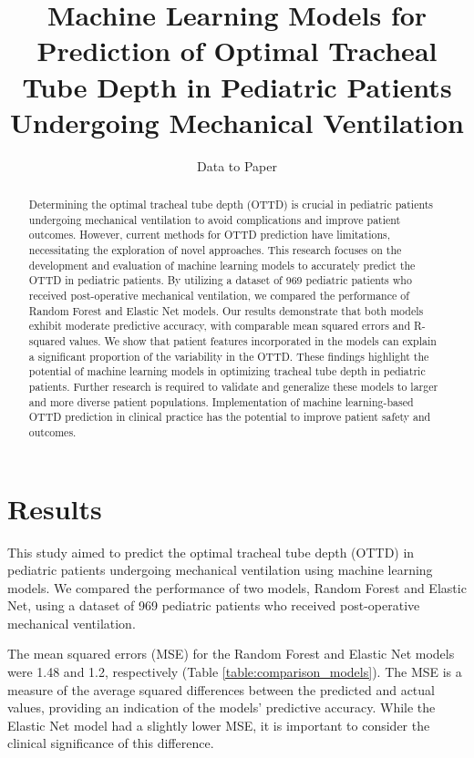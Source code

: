 \documentclass[11pt]{article}
\title{Machine Learning Models for Prediction of Optimal Tracheal Tube Depth in Pediatric Patients Undergoing Mechanical Ventilation}
\author{Data to Paper}
\begin{document}
\maketitle
\begin{abstract}
Determining the optimal tracheal tube depth (OTTD) is crucial in pediatric patients undergoing mechanical ventilation to avoid complications and improve patient outcomes. However, current methods for OTTD prediction have limitations, necessitating the exploration of novel approaches. This research focuses on the development and evaluation of machine learning models to accurately predict the OTTD in pediatric patients. By utilizing a dataset of 969 pediatric patients who received post-operative mechanical ventilation, we compared the performance of Random Forest and Elastic Net models. Our results demonstrate that both models exhibit moderate predictive accuracy, with comparable mean squared errors and R-squared values. We show that patient features incorporated in the models can explain a significant proportion of the variability in the OTTD. These findings highlight the potential of machine learning models in optimizing tracheal tube depth in pediatric patients. Further research is required to validate and generalize these models to larger and more diverse patient populations. Implementation of machine learning-based OTTD prediction in clinical practice has the potential to improve patient safety and outcomes.
\end{abstract}
\section*{Results}

This study aimed to predict the optimal tracheal tube depth (OTTD) in pediatric patients undergoing mechanical ventilation using machine learning models. We compared the performance of two models, Random Forest and Elastic Net, using a dataset of 969 pediatric patients who received post-operative mechanical ventilation.

The mean squared errors (MSE) for the Random Forest and Elastic Net models were 1.48 and 1.2, respectively (Table \ref{table:comparison_models}). The MSE is a measure of the average squared differences between the predicted and actual values, providing an indication of the models' predictive accuracy. While the Elastic Net model had a slightly lower MSE, it is important to consider the clinical significance of this difference.
\end{document}
